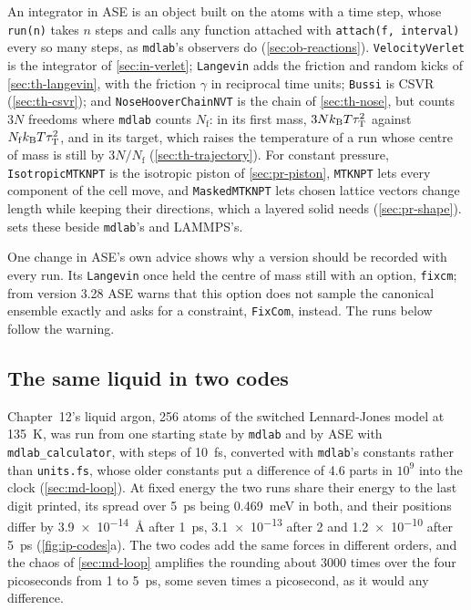 An integrator in ASE is an object built on the atoms with a time step,
whose \texttt{run(n)} takes $n$ steps and calls any function attached
with \texttt{attach(f, interval)} every so many steps, as \texttt{mdlab}'s
observers do (\cref{sec:ob-reactions}). \texttt{VelocityVerlet} is the
integrator of \cref{sec:in-verlet}; \texttt{Langevin} adds the friction
and random kicks of \cref{sec:th-langevin}, with the friction $\gamma$ in
reciprocal time units; \texttt{Bussi} is CSVR (\cref{sec:th-csvr}); and
\texttt{NoseHooverChainNVT} is the chain of \cref{sec:th-nose}, but
counts $3N$ freedoms where \texttt{mdlab} counts $N_{\mathrm f}$: in its
first mass, $3Nk_{\mathrm{B}} T\tau_{\mathrm T}^2$ against $N_{\mathrm f}k_{\mathrm{B}}
T\tau_{\mathrm T}^2$, and in its target, which raises the temperature of a
run whose centre of mass is still by $3N/N_{\mathrm f}$
(\cref{sec:th-trajectory}). For constant pressure, \texttt{IsotropicMTKNPT} is
the isotropic piston of \cref{sec:pr-piston}, \texttt{MTKNPT} lets every
component of the cell move, and \texttt{MaskedMTKNPT} lets chosen lattice
vectors change length while keeping their directions, which a layered
solid needs (\cref{sec:pr-shape}).  sets these
beside \texttt{mdlab}'s and LAMMPS's.

One change in ASE's own advice shows why a version should be recorded
with every run. Its \texttt{Langevin} once held the centre of mass still
with an option, \texttt{fixcm}; from version 3.28 ASE warns that this
option does not sample the canonical ensemble exactly and asks for a
constraint, \texttt{FixCom}, instead. The runs below follow the warning.

\subsection*{The same liquid in two codes}

Chapter~12's liquid argon, 256 atoms of the switched Lennard-Jones model
at \SI{135}{\kelvin}, was run from one starting state by \texttt{mdlab}
and by ASE with \texttt{mdlab\_calculator}, with steps of
\SI{10}{\femto\second}, converted with \texttt{mdlab}'s constants rather
than \texttt{units.fs}, whose older constants put a difference of 4.6
parts in $10^9$ into the clock (\cref{sec:md-loop}). At fixed energy the
two runs share their energy to the last digit printed, its spread over
\SI{5}{\pico\second} being \SI{0.469}{\milli\electronvolt} in both, and
their positions differ by \SI{3.9e-14}{\angstrom} after
\SI{1}{\pico\second}, \num{3.1e-13} after 2 and \num{1.2e-10} after
\SI{5}{\pico\second} (\cref{fig:ip-codes}a). The two codes add the same
forces in different orders, and the chaos of \cref{sec:md-loop} amplifies
the rounding about 3000 times over the four picoseconds from 1 to
\SI{5}{\pico\second}, some seven times a picosecond, as it would any
difference.

